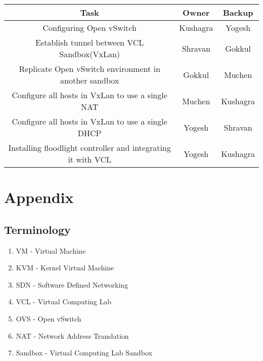 \documentclass{article}
\begin{document}
\begin{center}
 \begin{tabular}{||c | c | c ||} 
 \hline
 Task & Owner & Backup \\ [2ex] 
 \hline\hline
  Configuring Open vSwitch & Kushagra & Yogesh  \\
  \hline
  Establish tunnel between VCL Sandbox(VxLan) & Shravan & Gokkul  \\ 
  \hline
  Replicate Open vSwitch environment in another sandbox & Gokkul & Muchen  \\ 
  \hline
  Configure all hosts in VxLan to use a single NAT & Muchen & Kushagra  \\ 
  \hline
  Configure all hosts in VxLan to use a single DHCP & Yogesh & Shravan  \\ 
  \hline
    Installing floodlight controller and integrating it with VCL & Yogesh & Kushagra  \\ 
 \hline
\end{tabular}
\end{center}

\section{Appendix}
\subsection{Terminology}
\begin{enumerate}
    \item VM - Virtual Machine
    \item KVM - Kernel Virtual Machine
    \item SDN - Software Defined Networking
    \item VCL - Virtual Computing Lab
    \item OVS - Open vSwitch
    \item NAT - Network Address Translation
    \item Sandbox - Virtual Computing Lab Sandbox
\end{enumerate}



\end{document}
